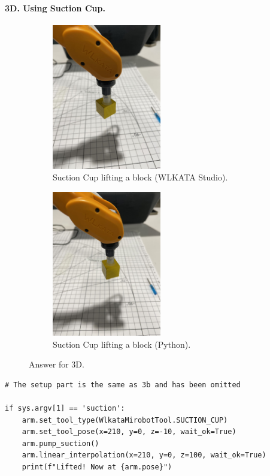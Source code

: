 \newpage
\paragraph{3D. Using Suction Cup.}
\begin{figure}
    \centering
    \begin{subfigure}[b]{0.3\textwidth}
        \includegraphics[height=2.5in]{image/3d_studio.jpg}
         \caption*{Suction Cup lifting a block (WLKATA Studio).}
     \end{subfigure}
     \hfill
     \begin{subfigure}[b]{0.3\textwidth}
        \includegraphics[height=2.5in]{image/3d_python.jpg}
         \caption*{Suction Cup lifting a block (Python).}
     \end{subfigure}
    \caption*{Answer for 3D.}
\end{figure}
%
\begin{verbatim}
# The setup part is the same as 3b and has been omitted

if sys.argv[1] == 'suction':
    arm.set_tool_type(WlkataMirobotTool.SUCTION_CUP)
    arm.set_tool_pose(x=210, y=0, z=-10, wait_ok=True)
    arm.pump_suction()
    arm.linear_interpolation(x=210, y=0, z=100, wait_ok=True)
    print(f"Lifted! Now at {arm.pose}")
\end{verbatim}


